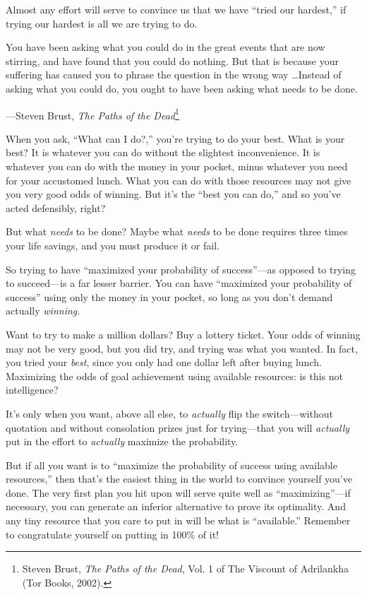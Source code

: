 {
 Almost any effort will serve to convince us that we have
``tried our hardest,'' if trying our
hardest is all we are trying to do.}

{
 You have been asking what you could do in the great events that
are now stirring, and have found that you could do nothing. But that is
because your suffering has caused you to phrase the question in the
wrong way \ldots Instead of asking what you could do, you ought to have
been asking what needs to be done.}

{\raggedleft
 {}---Steven Brust, \textit{The Paths of the
Dead}\footnote{Steven Brust, \textit{The Paths of the Dead}, Vol. 1 of The
Viscount of Adrilankha (Tor Books, 2002).}
\par}


\bigskip

{
 When you ask, ``What can I
do?,'' you're trying to do your best.
What is your best? It is whatever you can do without the slightest
inconvenience. It is whatever you can do with the money in your pocket,
minus whatever you need for your accustomed lunch. What you can do with
those resources may not give you very good odds of winning. But
it's the ``best you can
do,'' and so you've acted defensibly,
right?}

{
 But what \textit{needs} to be done? Maybe what \textit{needs} to
be done requires three times your life savings, and you must produce it
or fail.}

{
 So trying to have ``maximized your probability of
success''---as opposed to trying to succeed---is a
far lesser barrier. You can have ``maximized your
probability of success'' using only the money in your
pocket, so long as you don't demand actually
\textit{winning.}}

{
 Want to try to make a million dollars? Buy a lottery ticket. Your
odds of winning may not be very good, but you did try, and trying was
what you wanted. In fact, you tried your \textit{best}, since you only
had one dollar left after buying lunch. Maximizing the odds of goal
achievement using available resources: is this not intelligence?}

{
 It's only when you want, above all else, to
\textit{actually} flip the switch---without quotation and without
consolation prizes just for trying---that you will \textit{actually}
put in the effort to \textit{actually} maximize the probability.}

{
 But if all you want is to ``maximize the
probability of success using available resources,''
then that's the easiest thing in the world to convince
yourself you've done. The very first plan you hit upon
will serve quite well as
``maximizing''---if necessary, you
can generate an inferior alternative to prove its optimality. And any
tiny resource that you care to put in will be what is
``available.'' Remember to
congratulate yourself on putting in 100\% of it!}


